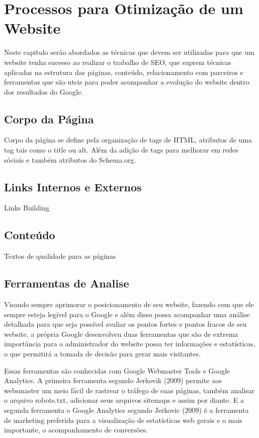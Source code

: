 \documentclass[
	12pt,				%
	openright,			%
	twoside,			%
	a4paper,			%
	english,			%
	french,				%
	spanish,			%
	brazil				%
	]{abntex2}
\begin{document}
\chapter{Processos para Otimização de um Website}

Neste capitulo serão abordados as técnicas que devem ser utilizadas para que um website tenha sucesso ao realizar o trabalho de SEO, que suprem técnicas aplicadas na estrutura das páginas, conteúdo, relacionamento com parceiros e ferramentas que são uteis para poder acompanhar a evolução do website dentro dos resultados do Google.

\section{Corpo da Página}

Corpo da página se define pela organização de tags de HTML, atributos de uma tag tais como o title ou alt. Além da adição de tags para melhorar em redes sóciais e também atributos do Schema.org.

\section{Links Internos e Externos}

Links Building

\section{Conteúdo}

Textos de qualidade para as páginas

\section{Ferramentas de Analise}

Visando sempre aprimorar o posicionamento de seu website, fazendo com que ele sempre esteja legível para o Google e além disso possa acompanhar uma análise detalhada para que seja possível avaliar os pontos fortes e pontos fracos de seu website, a própria Google desenvolveu duas ferramentas que são de extrema importância para o administrador do website possa ter informações e estatísticas, o que permitirá a tomada de decisão para gerar mais visitantes.

Essas ferramentas são conhecidas com Google Webmaster Tools e Google Analytics. A primeira ferramenta segundo Jerkovik (2009) permite aos websmaster um meio fácil de rastrear o tráfego de suas páginas, também analisar o arquivo robots.txt, adicionar seus arquivos sitemaps e assim por diante. E a segunda ferramenta o Google Analytics segundo Jerkovic (2009) é a ferramenta de marketing preferida para a visualização de estatísticas web gerais e o mais importante, o acompanhamento de conversões.
\end{document}
